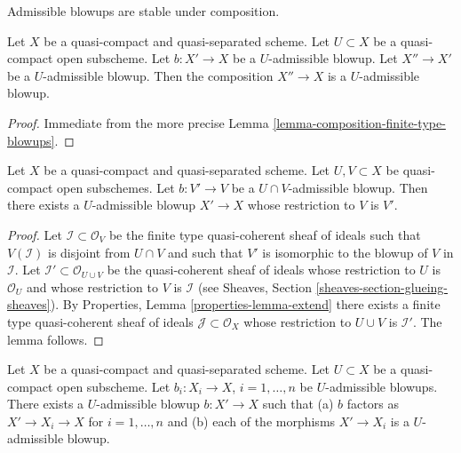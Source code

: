 \begin{lemma}
\label{lemma-composition-admissible-blowups}
\begin{slogan}
Admissible blowups are stable under composition.
\end{slogan}
Let $X$ be a quasi-compact and quasi-separated scheme.
Let $U \subset X$ be a quasi-compact open subscheme.
Let $b : X' \to X$ be a $U$-admissible blowup.
Let $X'' \to X'$ be a $U$-admissible blowup.
Then the composition $X'' \to X$ is a $U$-admissible blowup.
\end{lemma}

\begin{proof}
Immediate from the more precise
Lemma \ref{lemma-composition-finite-type-blowups}.
\end{proof}

\begin{lemma}
\label{lemma-extend-admissible-blowups}
Let $X$ be a quasi-compact and quasi-separated scheme.
Let $U, V \subset X$ be quasi-compact open subschemes.
Let $b : V' \to V$ be a $U \cap V$-admissible blowup.
Then there exists a $U$-admissible blowup $X' \to X$
whose restriction to $V$ is $V'$.
\end{lemma}

\begin{proof}
Let $\mathcal{I} \subset \mathcal{O}_V$ be the finite type
quasi-coherent sheaf of ideals such that $V(\mathcal{I})$ is
disjoint from $U \cap V$ and such that $V'$ is isomorphic to the
blowup of $V$ in $\mathcal{I}$. Let
$\mathcal{I}' \subset \mathcal{O}_{U \cup V}$ be the quasi-coherent
sheaf of ideals whose restriction to $U$ is $\mathcal{O}_U$ and
whose restriction to $V$ is $\mathcal{I}$ (see Sheaves, Section
\ref{sheaves-section-glueing-sheaves}).
By Properties, Lemma \ref{properties-lemma-extend}
there exists a finite type quasi-coherent sheaf of ideals
$\mathcal{J} \subset \mathcal{O}_X$ whose restriction to $U \cup V$ is
$\mathcal{I}'$. The lemma follows.
\end{proof}

\begin{lemma}
\label{lemma-dominate-admissible-blowups}
Let $X$ be a quasi-compact and quasi-separated scheme.
Let $U \subset X$ be a quasi-compact open subscheme.
Let $b_i : X_i \to X$, $i = 1, \ldots, n$ be $U$-admissible blowups.
There exists a $U$-admissible blowup $b : X' \to X$ such that
(a) $b$ factors as $X' \to X_i \to X$ for $i = 1, \ldots, n$ and
(b) each of the morphisms $X' \to X_i$ is a $U$-admissible blowup.
\end{lemma}

